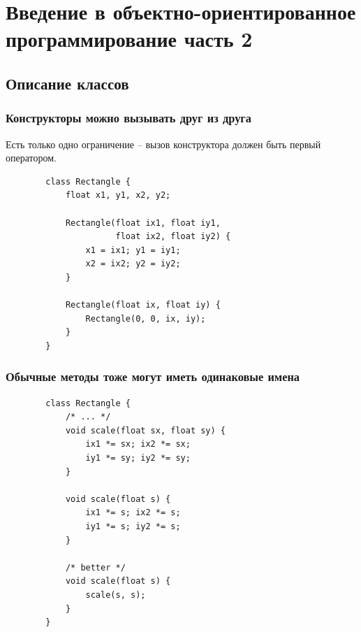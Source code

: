 \section{Введение в объектно-ориентированное программирование часть 2}
\subsection{Описание классов}
\begin{frame}[fragile]
	\frametitle{Конструкторы можно вызывать друг из друга}
	{\large Есть только одно ограничение -- вызов конструктора должен быть первый оператором.}

	\medskip
	\begin{verbatim}
		class Rectangle {
		    float x1, y1, x2, y2;

		    Rectangle(float ix1, float iy1,
		              float ix2, float iy2) {
		        x1 = ix1; y1 = iy1;
		        x2 = ix2; y2 = iy2;
		    }

		    Rectangle(float ix, float iy) {
		        Rectangle(0, 0, ix, iy);
		    }
		}
	\end{verbatim}

\end{frame}

\begin{frame}[fragile]
	\frametitle{Обычные методы тоже могут иметь одинаковые имена}

	\begin{large}
	\begin{verbatim}
		class Rectangle {
		    /* ... */
		    void scale(float sx, float sy) {
		        ix1 *= sx; ix2 *= sx;
		        iy1 *= sy; iy2 *= sy;
		    }

		    void scale(float s) {
		        ix1 *= s; ix2 *= s;
		        iy1 *= s; iy2 *= s;
		    }

		    /* better */
		    void scale(float s) {
		        scale(s, s);
		    }
		}
	\end{verbatim}
	\end{large}
\end{frame}

